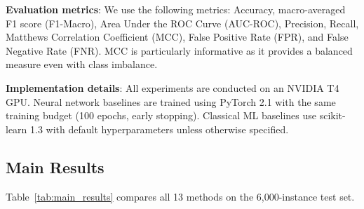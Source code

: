 \documentclass[10pt,letterpaper]{article}
\begin{document}
\textbf{Evaluation metrics}: We use the following metrics: Accuracy, macro-averaged F1 score (F1-Macro), Area Under the ROC Curve (AUC-ROC), Precision, Recall, Matthews Correlation Coefficient (MCC), False Positive Rate (FPR), and False Negative Rate (FNR). MCC is particularly informative as it provides a balanced measure even with class imbalance.

\textbf{Implementation details}: All experiments are conducted on an NVIDIA T4 GPU. Neural network baselines are trained using PyTorch 2.1 with the same training budget (100 epochs, early stopping). Classical ML baselines use scikit-learn 1.3 with default hyperparameters unless otherwise specified.

\subsection*{Main Results}

Table~\ref{tab:main_results} compares all 13 methods on the 6,000-instance test set.
\end{document}
